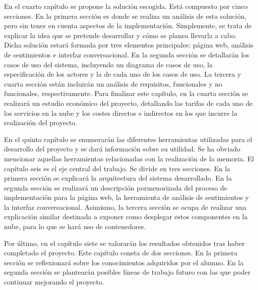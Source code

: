 En el cuarto capítulo se propone la solución escogida. Está compuesto por cinco secciones. En la primera sección es donde se realiza un análisis de esta solución, pero sin tener en cuenta aspectos de la implementación. Simplemente, se trata de explicar la idea que se pretende desarrollar y cómo se planea llevarla a cabo. Dicha solución estará formada por tres elementos principales: página web, análisis de sentimientos e interfaz conversacional. En la segunda sección se detallarán los casos de uso del sistema, incluyendo un diagrama de casos de uso, la especificación de los actores y la de cada uno de los casos de uso. La tercera y cuarta sección están incluirán un análisis de requisitos, funcionales y no funcionales, respectivamente.
Para finalizar este capítulo, en la cuarta sección se realizará un estudio económico del proyecto, detallando las tarifas de cada uno de los servicios en la nube y los costes directos e indirectos en los que incurre la realización del proyecto.

En el quinto capítulo se enumerarán las diferentes herramientas utilizadas para el desarrollo del proyecto y se dará información sobre su utilidad. Se ha obviado mencionar aquellas herramientas relacionadas con la realización de la memoria. 
\newpage
El capítulo seis es el eje central del trabajo. Se divide en tres secciones. En la primera sección se explicará la arquitectura del sistema desarrollado. En la segunda sección se realizará un descripción pormenorizada del proceso de implementación para la página web, la herramienta de análisis de sentimientos y la interfaz conversacional. Asimismo, la tercera sección se ocupa de realizar una explicación similar destinada a exponer como desplegar estos componentes en la nube, para lo que se hará uso de contenedores. 

Por último, en el capítulo siete se valorarán los resultados obtenidos tras haber completado el proyecto. Este capítulo consta de dos secciones. En la primera sección se reflexionará sobre los conocimientos adquiridos por el alumno. En la segunda sección se plantearán posibles líneas de trabajo futuro con las que poder continuar mejorando el proyecto.
